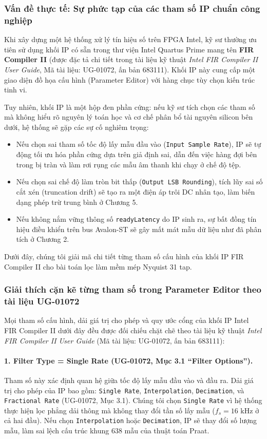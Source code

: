 \subsubsection*{Vấn đề thực tế: Sự phức tạp của các tham số IP chuẩn công nghiệp}
Khi xây dựng một hệ thống xử lý tín hiệu số trên FPGA Intel, kỹ sư thường ưu tiên sử dụng khối IP có sẵn trong thư viện Intel Quartus Prime mang tên \textbf{FIR Compiler II} (được đặc tả chi tiết trong tài liệu kỹ thuật \emph{Intel FIR Compiler II User Guide}, Mã tài liệu: UG-01072, ấn bản 683111). Khối IP này cung cấp một giao diện đồ họa cấu hình (Parameter Editor) với hàng chục tùy chọn kiến trúc tinh vi.

Tuy nhiên, khối IP là một hộp đen phần cứng: nếu kỹ sư tích chọn các tham số mà không hiểu rõ nguyên lý toán học và cơ chế phân bổ tài nguyên silicon bên dưới, hệ thống sẽ gặp các sự cố nghiêm trọng:
\begin{itemize}[leftmargin=1.5em, itemsep=2pt]
    \item Nếu chọn sai tham số tốc độ lấy mẫu đầu vào (\texttt{Input Sample Rate}), IP sẽ tự động tối ưu hóa phần cứng dựa trên giả định sai, dẫn đến việc hàng đợi bên trong bị tràn và làm rơi rụng các mẫu âm thanh khi chạy ở chế độ tệp.
    \item Nếu chọn sai chế độ làm tròn bit thấp (\texttt{Output LSB Rounding}), tích lũy sai số cắt xén (truncation drift) sẽ tạo ra một điện áp trôi DC nhân tạo, làm biến dạng phép trừ trung bình ở Chương 5.
    \item Nếu không nắm vững thông số \texttt{readyLatency} do IP sinh ra, sự bất đồng tín hiệu điều khiển trên bus Avalon-ST sẽ gây mất mát mẫu dữ liệu như đã phân tích ở Chương 2.
\end{itemize}

Dưới đây, chúng tôi giải mã chi tiết từng tham số cấu hình của khối IP FIR Compiler II cho bài toán lọc làm mềm mép Nyquist 31 tap.

\subsubsection*{Giải thích cặn kẽ từng tham số trong Parameter Editor theo tài liệu UG-01072}

Mọi tham số cấu hình, dải giá trị cho phép và quy ước cổng của khối IP Intel FIR Compiler II dưới đây đều được đối chiếu chặt chẽ theo tài liệu kỹ thuật \emph{Intel FIR Compiler II User Guide} (Mã tài liệu: UG-01072, ấn bản 683111):

\paragraph{1. Filter Type = Single Rate (UG-01072, Mục 3.1 ``Filter Options'').}
Tham số này xác định quan hệ giữa tốc độ lấy mẫu đầu vào và đầu ra. Dải giá trị cho phép của IP bao gồm: \texttt{Single Rate}, \texttt{Interpolation}, \texttt{Decimation}, và \texttt{Fractional Rate} (UG-01072, Mục 3.1). Chúng tôi chọn \texttt{Single Rate} vì hệ thống thực hiện lọc phẳng dải thông mà không thay đổi tần số lấy mẫu ($f_s = 16\text{ kHz}$ ở cả hai đầu). 
Nếu chọn \texttt{Interpolation} hoặc \texttt{Decimation}, IP sẽ thay đổi số lượng mẫu, làm sai lệch cấu trúc khung 638 mẫu của thuật toán Praat.

